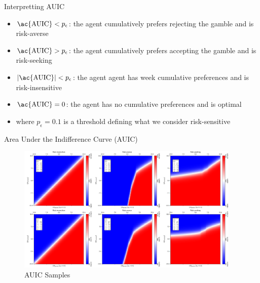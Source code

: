 \documentclass[aspectratio=1610, xcolor=dvipsnames]{packages/beamer}
\begin{document}
\begin{frame}{Interpretting AUIC}

    \begin{itemize}%
        \item $\text{\ac{AUIC}} < p_{\epsilon} $: the agent cumulatively prefers rejecting the gamble and is risk-averse
        \item $\text{\ac{AUIC}} > p_{\epsilon}$: the agent cumulatively prefers accepting the gamble and is risk-seeking
        \item $|\text{\ac{AUIC}}| < p_{\epsilon}$: the agent agent has week cumulative preferences and is risk-insensitive
        \item $\text{\ac{AUIC}} = 0$: the agent has no cumulative preferences and is optimal
    \end{itemize}
    \begin{itemize}
        \item where $p_{\epsilon}=0.1$ is a threshold defining what we consider risk-sensitive
    \end{itemize}
\end{frame}

\begin{frame}{Area Under the Indifference Curve (AUIC)}
     \begin{figure}
        \centering
        \includegraphics[width=0.95\textwidth]{../results/Fig_AUIC}
        \caption{AUIC Samples}
        \label{fig:AUIC}
    \end{figure}

\end{frame}
\end{document}
